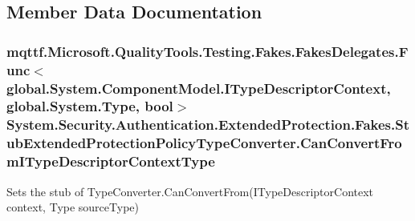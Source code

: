 \subsection{Member Data Documentation}
\hypertarget{class_system_1_1_security_1_1_authentication_1_1_extended_protection_1_1_fakes_1_1_stub_extendedf67afed15bbc0df07bfc91316f6f81f0_aee4d3ae3ee82b0fbf9a0aa54ce2748da}{
\subsubsection[{Can\-Convert\-From\-I\-Type\-Descriptor\-Context\-Type}]{\setlength{\rightskip}{0pt plus 5cm}mqttf.\-Microsoft.\-Quality\-Tools.\-Testing.\-Fakes.\-Fakes\-Delegates.\-Func$<$global.\-System.\-Component\-Model.\-I\-Type\-Descriptor\-Context, global.\-System.\-Type, bool$>$ System.\-Security.\-Authentication.\-Extended\-Protection.\-Fakes.\-Stub\-Extended\-Protection\-Policy\-Type\-Converter.\-Can\-Convert\-From\-I\-Type\-Descriptor\-Context\-Type}}\label{class_system_1_1_security_1_1_authentication_1_1_extended_protection_1_1_fakes_1_1_stub_extendedf67afed15bbc0df07bfc91316f6f81f0_aee4d3ae3ee82b0fbf9a0aa54ce2748da}


Sets the stub of Type\-Converter.\-Can\-Convert\-From(\-I\-Type\-Descriptor\-Context context, Type source\-Type)

